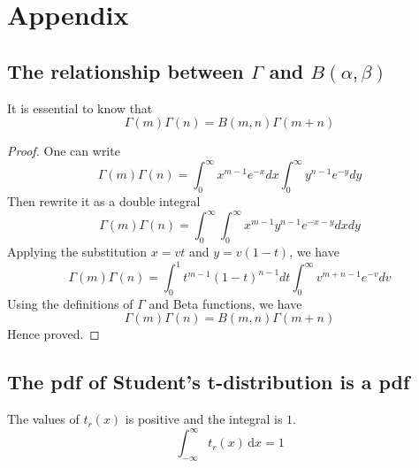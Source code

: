 \documentclass[a4paper]{article}
\begin{document}
\appendix

\section{Appendix}

\subsection{The relationship between $\Gamma$ and $B(\alpha, \beta)$}
It is essential to know that
\begin{equation*}
    \Gamma(m)\Gamma(n) = B(m, n) \Gamma(m+n)
\end{equation*}

\begin{proof} \label{The relationship between Gamma and Beta}
    One can write
    \begin{equation*}
        \Gamma(m)\Gamma(n) = \int_{0}^{\infty} x^{m-1} e^{-x} dx \int_{0}^{\infty} y^{n-1} e^{-y} dy
    \end{equation*}
    Then rewrite it as a double integral
    \begin{equation*}
        \Gamma(m)\Gamma(n) = \int_{0}^{\infty} \int_{0}^{\infty} x^{m-1} y^{n-1} e^{-x-y} dx dy
    \end{equation*}
    Applying the substitution $x=vt$ and $y=v(1-t)$, we have
    \begin{equation*}
        \Gamma(m)\Gamma(n) = \int_{0}^{1} t^{m-1} (1-t)^{n-1} dt \int_{0}^{\infty} v^{m+n-1} e^{-v} dv
    \end{equation*}
    Using the definitions of $\Gamma$ and Beta functions, we have
    \begin{equation*}
        \Gamma(m)\Gamma(n) = B(m, n) \Gamma(m+n)
    \end{equation*}
    Hence proved.
\end{proof}

\subsection{The pdf of Student's t-distribution is a pdf}
The values of $t_r(x)$ is positive and the integral is $1$.
\begin{equation*}
    \int_{-\infty}^{\infty} t_r(x) \,\mathrm{d}x = 1
\end{equation*}
\end{document}
